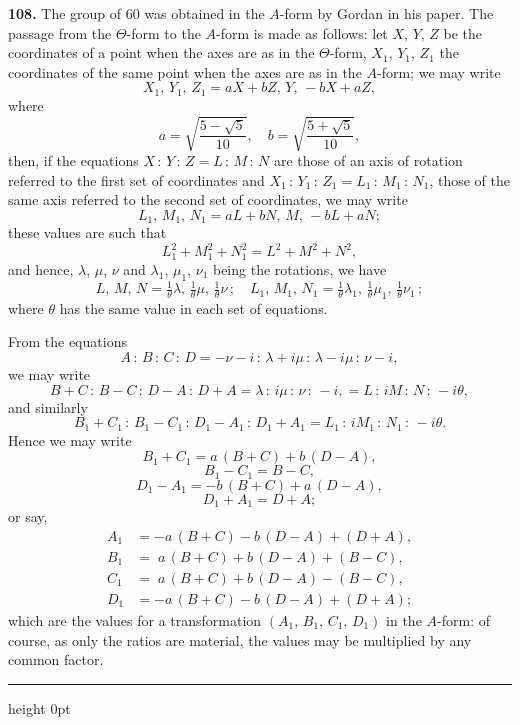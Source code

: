 \documentclass[11pt,a4paper]{article}
\newcommand{\artno}[1]{\textbf{#1.}\quad}
\begin{document}
\artno{108} The group of 60 was obtained in the $A$-form by Gordan in his
paper. The passage from the $\Theta$-form to the $A$-form is made as follows:
let $X$, $Y$, $Z$ be the coordinates of a point when the axes are as in the
$\Theta$-form, $X_{1}$, $Y_{1}$, $Z_{1}$ the coordinates of the same point
when the axes are as in the $A$-form; we may write
\[
  X_{1},\,Y_{1},\,Z_{1} = aX + bZ,\,Y,\,-bX + aZ,
\]
where
\[
  a = \sqrt{\frac{5 - \sqrt5}{10}},\quad b = \sqrt{\frac{5 + \sqrt5}{10}},
\]
then, if the equations $X\,:\,Y\,:\,Z = L\,:\,M\,:\,N$ are those of an axis
of rotation referred to the first set of coordinates and
$X_{1}\,:\,Y_{1}\,:\,Z_{1} = L_{1}\,:\,M_{1}\,:\,N_{1}$, those of the same
axis referred to the second set of coordinates, we may write
\[
  L_{1},\,M_{1},\,N_{1} = aL + bN,\,M,\,-bL + aN;
\]
these values are such that
\[
  L_{1}^{2} + M_{1}^{2} + N_{1}^{2} = L^{2} + M^{2} + N^{2},
\]
and hence, $\lambda$, $\mu$, $\nu$ and $\lambda_{1}$, $\mu_{1}$, $\nu_{1}$
being the rotations, we have
\[
  L,\,M,\,N = \tfrac{1}{\theta}\lambda,\,\tfrac{1}{\theta}\mu,\,\tfrac{1}{\theta}\nu\,;\quad
  L_{1},\,M_{1},\,N_{1} = \tfrac{1}{\theta}\lambda_{1},\,\tfrac{1}{\theta}\mu_{1},
                            \,\tfrac{1}{\theta}\nu_{1}\,;
\]
where $\theta$ has the same value in each set of equations.

From the equations
\[
  A\,:\,B\,:\,C\,:\,D = -\nu - i\,:\,\lambda + i\mu\,:\,\lambda - i\mu\,:\,\nu - i,
\]
we may write
\[
  B + C\,:\,B - C\,:\,D - A\,:\,D + A
   = \lambda\,:\,i\mu\,:\,\nu\,:\,-i,
   = L\,:\,iM\,:\,N\,:\,-i\theta,
\]
and similarly
\[
  B_{1} + C_{1}\,:\,B_{1} - C_{1}\,:\,D_{1} - A_{1}\,:\,D_{1} + A_{1}
   = L_{1}\,:\,iM_{1}\,:\,N_{1}\,:\,-i\theta.
\]
Hence we may write
\[
  B_{1} + C_{1} = a\,(B + C) + b\,(D - A),
\]
\[
  B_{1} - C_{1} = B - C,
\]
\[
  D_{1} - A_{1} = -b\,(B + C) + a\,(D - A),
\]
\[
  D_{1} + A_{1} = D + A;
\]
or say,
\begin{align*}
  A_{1} &= -a\,(B + C) - b\,(D - A) + (D + A),\\
  B_{1} &= \;a\,(B + C) + b\,(D - A) + (B - C),\\
  C_{1} &= \;a\,(B + C) + b\,(D - A) - (B - C),\\
  D_{1} &= -a\,(B + C) - b\,(D - A) + (D + A);
\end{align*}
which are the values for a transformation
$(A_{1},\,B_{1},\,C_{1},\,D_{1})$ in the $A$-form: of course, as only the
ratios are material, the values may be multiplied by any common factor.

\bigskip
\hrule height 0pt
\bigskip
\end{document}
